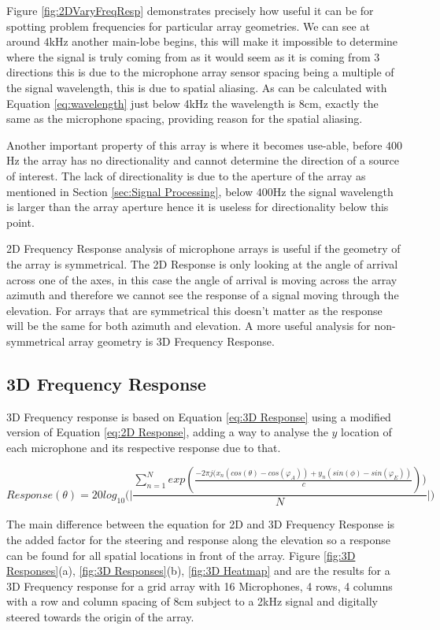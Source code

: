 \documentclass{UoNMCHA}
\numberwithin{equation}{section}
\begin{document}
    Figure \ref{fig:2DVaryFreqResp} demonstrates precisely how useful it can be for spotting problem frequencies for particular array geometries. We can see at around $4$kHz another main-lobe begins, this will make it impossible to determine where the signal is truly coming from as it would seem as it is coming from 3 directions this is due to the microphone array sensor spacing being a multiple of the signal wavelength, this is due to spatial aliasing. As can be calculated with Equation \ref{eq:wavelength} just below 4kHz the wavelength is 8cm, exactly the same as the microphone spacing, providing reason for the spatial aliasing.
    
    Another important property of this array is where it becomes use-able, before $400$Hz the array has no directionality and cannot determine the direction of a source of interest. The lack of directionality is due to the aperture of the array as mentioned in Section \ref{sec:Signal Processing}, below $400$Hz the signal wavelength is larger than the array aperture hence it is useless for directionality below this point.
    
    2D Frequency Response analysis of microphone arrays is useful if the geometry of the array is symmetrical. The 2D Response is only looking at the angle of arrival across one of the axes, in this case the angle of arrival is moving across the array azimuth and therefore we cannot see the response of a signal moving through the elevation. For arrays that are symmetrical this doesn't matter as the response will be the same for both azimuth and elevation. A more useful analysis for non-symmetrical array geometry is 3D Frequency Response.
\subsection{3D Frequency Response} \label{sec:3D Freq Response}
    3D Frequency response is based on Equation \ref{eq:3D Response} using a modified version of Equation \ref{eq:2D Response}, adding a way to analyse the $y$ location of each microphone and its respective response due to that.
    
    \begin{equation}
        Response(\theta) = 20log_{10} \Big( \Big|\frac{\sum_{n=1}^N exp(\frac{-2\pi j(x_n(cos(\theta)-cos(\varphi_A))+y_n(sin(\phi)-sin(\varphi_E))}{c}))}{N}\Big| \Big)
        \label{eq:3D Response}
    \end{equation}
    
    The main difference between the equation for 2D and 3D Frequency Response is the added factor for the steering and response along the elevation so a response can be found for all spatial locations in front of the array. Figure \ref{fig:3D Responses}(a), \ref{fig:3D Responses}(b), \ref{fig:3D Heatmap} and are the results for a 3D Frequency response for a grid array with 16 Microphones, 4 rows, 4 columns with a row and column spacing of 8cm subject to a 2kHz signal and digitally steered towards the origin of the array.
\end{document}
